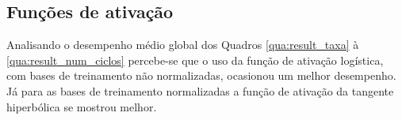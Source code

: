 \documentclass[12pt,oneside,a4paper,chapter=TITLE,section=TITLE,sumario
		=tradicional]{abntex2}
\begin{document}
		\subsection{Funções de ativação}
		
		Analisando o desempenho médio global dos Quadros \ref{qua:result_taxa} à \ref{qua:result_num_ciclos} percebe-se que o uso da função de ativação logística, com bases de treinamento não normalizadas, ocasionou um melhor desempenho. Já para as bases de treinamento normalizadas a função de ativação da tangente hiperbólica se mostrou melhor.
		
		\begin{comment}
		\subsection{Comparativo entre os parâmetros de configuração}
		
		Para realizar o comparativo entre os parâmetros, visando encontrar o seu grau de influência, devemos realizar alguns cálculos utilizando os quadros anteriores.
		
		\begin{lista}
			
			\item Taxa de aprendizado: Para realizar o comparativo, utilizou-se a variação média para cada função de ativação, existentes no Quadro \ref{qua:result_taxa}.
			
			\item \textit{Momentum}: Para realizar o comparativo, utilizou-se a variação média para cada função de ativação, existentes no Quadro \ref{qua:result_momentumb}.
			
			\item Número de neurônios: Para realizar o comparativo, utilizou-se a média entre as variações médias para cada função de ativação, existentes nos Quadros \ref{qua:result_numcamadas1}, \ref{qua:result_numcamadas2}, \ref{qua:result_numcamadas3} e \ref{qua:result_numcamadas4}.
			
 			\item Número de camadas ocultas: Para realizar o comparativo, utilizou-se a média entre as diferenças no desempenho médio para cada função de ativação, existentes nos Quadros \ref{qua:result_numcamadas2b}, \ref{qua:result_numcamadas3b} e \ref{qua:result_numcamadas4b}.
 			
 			\item Tamanho do lote (\textit{batch size}): Para realizar o comparativo, utilizou-se a variação média para cada função de ativação, existentes no Quadro \ref{qua:result_tam_lote}.
 			

\end{comment}
\end{document}
